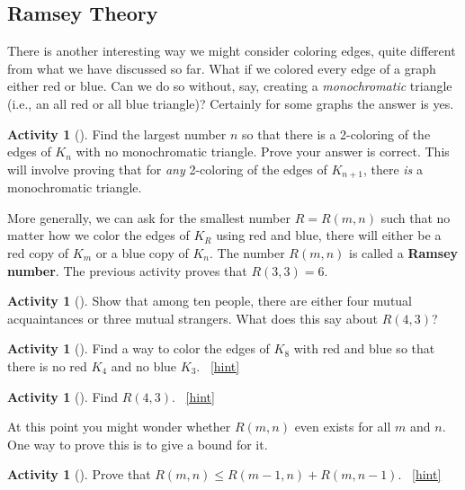 \documentclass[10pt,]{book}
\newcommand{\terminology}[1]{\textbf{#1}}
\theoremstyle{plain}
\theoremstyle{definition}
\theoremstyle{definition}
\theoremstyle{definition}
\newtheorem{activity}[project]{Activity}
\numberwithin{equation}{chapter}
\begin{document}
\subsection[{Ramsey Theory}]{Ramsey Theory}\label{subsec-}
\hypertarget{p-1669}{}%
There is another interesting way we might consider coloring edges, quite different from what we have discussed so far. What if we colored every edge of a graph either red or blue. Can we do so without, say, creating a \emph{monochromatic} triangle (i.e., an all red or all blue triangle)? Certainly for some graphs the answer is yes.%
\begin{activity}[]\label{act_R-3-3}
\hypertarget{p-1670}{}%
Find the largest number \(n\) so that there is a 2-coloring of the edges of \(K_n\) with no monochromatic triangle.  Prove your answer is correct.  This will involve proving that for \emph{any} 2-coloring of the edges of \(K_{n+1}\), there \emph{is} a monochromatic triangle.%
\end{activity}
\hypertarget{p-1671}{}%
More generally, we can ask for the smallest number \(R = R(m,n)\) such that no matter how we color the edges of \(K_R\) using red and blue, there will either be a red copy of \(K_m\) or a blue copy of \(K_n\).  The number \(R(m,n)\) is called a \terminology{Ramsey number}.  The previous activity proves that \(R(3,3) = 6\).%
\begin{activity}[]\label{activity-307}
\hypertarget{p-1672}{}%
Show that among ten people, there are either four mutual acquaintances or three mutual strangers.  What does this say about \(R(4,3)\)?%
\end{activity}
\begin{activity}[]\label{activity-308}
\hypertarget{p-1674}{}%
Find a way to color the edges of \(K_8\) with red and blue so that there is no red \(K_4\) and no blue \(K_3\).%
~\hfill{\tiny\hyperlink{a-315}{[hint]}\hypertarget{q-315}{}}\end{activity}
\begin{activity}[]\label{activity-309}
\hypertarget{p-1676}{}%
Find \(R(4,3)\).%
~\hfill{\tiny\hyperlink{a-316}{[hint]}\hypertarget{q-316}{}}\end{activity}
\hypertarget{p-1679}{}%
At this point you might wonder whether \(R(m,n)\) even exists for all \(m\) and \(n\).  One way to prove this is to give a bound for it.%
\begin{activity}[]\label{Ramseyrecurrence}
\hypertarget{p-1680}{}%
Prove that \(R(m,n)\le R(m-1,n) + R(m,n-1)\).%
~\hfill{\tiny\hyperlink{a-317}{[hint]}\hypertarget{q-317}{}}\end{activity}
\end{document}
